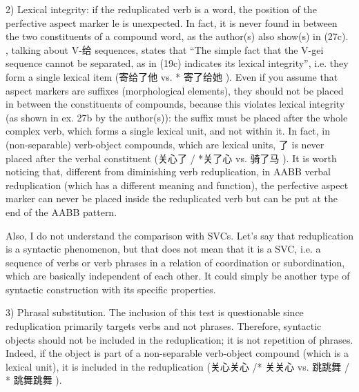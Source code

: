 \documentclass[fleqn,twoside]{article}
\begin{document}
\begin{enumerate}
2) Lexical integrity: if the reduplicated verb is a word, the position of the perfective aspect
marker le is unexpected. In fact, it is never found in between the two constituents of a compound
word, as the author(s) also show(s) in (27c). \citet[1282]{Her2006}, talking about V-给  sequences,
states that ``The simple fact that the V-gei sequence cannot be separated, as in (19c) indicates its
lexical integrity'', i.e. they form a single lexical item (寄给了他   vs. * 寄了给她   ).
Even if you assume that aspect markers are suffixes (morphological elements), they should not be placed in between the constituents of compounds, because this violates lexical integrity (as shown in ex. 27b by the author(s)): the suffix  must be placed after the whole complex verb, which forms a single lexical unit, and not within it. In fact, in (non-separable) verb-object compounds, which are lexical units, 了  is never placed after the verbal constituent (关心了  / *关了心   vs. 骑了马  ).
It is worth noticing that, different from diminishing verb reduplication, in AABB verbal reduplication (which has a different meaning and function), the perfective aspect marker  can never be placed inside the reduplicated verb but can be put at the end of the AABB pattern. 

Also, I do not understand the comparison with SVCs. Let's say that reduplication is a syntactic phenomenon, but that does not mean that it is a SVC, i.e. a sequence of verbs or verb phrases in a relation of coordination or subordination, which are basically independent of each other. It could simply be another type of syntactic construction with its specific properties.

3) Phrasal substitution. The inclusion of this test is questionable since reduplication primarily targets verbs and not phrases. Therefore, syntactic objects should not be included in the reduplication; it is not repetition of phrases. Indeed, if the object is part of a non-separable verb-object compound (which is a lexical unit), it is included in the reduplication (关心关心  /*  关关心   vs. 跳跳舞   / * 跳舞跳舞  ).


\end{enumerate}
\end{document}
